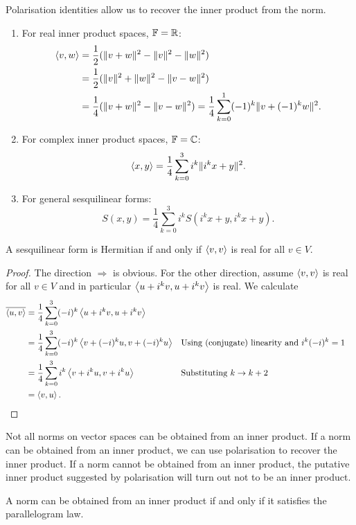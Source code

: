 Polarisation identities allow us to recover the inner product from the norm.
\begin{theorem} \label{polarisationIdentities}
\mbox{}
\begin{enumerate}
\item For real inner product spaces, $\mathbb{F} = \mathbb{R}$:
\begin{align*}
\left\langle v,w \right\rangle &= \frac{1}{2}(\lVert v+w\rVert^2 - \lVert v\rVert^2-\lVert w\rVert^2) \\
&= \frac{1}{2}(\lVert v\rVert^2 + \lVert w\rVert^2-\lVert v-w\rVert^2) \\
&= \frac{1}{4}(\lVert v+w\rVert^2 - \lVert v-w\rVert^2) = \frac{1}{4}\sum_{k=0}^1 (-1)^k\lVert v+(-1)^k w\rVert^2.
\end{align*}
\item For complex inner product spaces, $\mathbb{F} = \mathbb{C}$:
\[ \left\langle x,y \right\rangle = \frac{1}{4}\sum_{k=0}^3 i^k\lVert i^k x+y\rVert^2. \]
\item For general sesquilinear forms:
\[ S(x,y) = \frac{1}{4}\sum_{k=0}^3 i^k S(i^k x+y, i^k x+y). \]
\end{enumerate}
\end{theorem}
\begin{corollary} \label{HermitianRealQuadratic}
A sesquilinear form is Hermitian \textup{if and only if} $\left\langle v,v \right\rangle$ is real for all $v\in V$.
\end{corollary}
\begin{proof}
The direction $\Rightarrow$ is obvious. For the other direction, assume $\left\langle v,v \right\rangle$ is real for all $v\in V$ and in particular $\left\langle u+i^kv,u+i^kv \right\rangle$ is real. We calculate
\begin{align*}
\overline{\left\langle u,v \right\rangle} &= \frac{1}{4}\sum^3_{k=0}(-i)^k\left\langle u+i^kv,u+i^kv \right\rangle \\
&= \frac{1}{4}\sum^3_{k=0}(-i)^k\left\langle v+(-i)^ku,v+(-i)^ku \right\rangle & &\text{Using (conjugate) linearity and $i^k(-i)^k=1$}\\
&= \frac{1}{4}\sum^3_{k=0}i^k\left\langle v+i^ku,v+i^ku \right\rangle & &\text{Substituting $k\to k+2$}\\
&= \left\langle v,u \right\rangle.
\end{align*}
\end{proof}
Not all norms on vector spaces can be obtained from an inner product. If a norm can be obtained from an inner product, we can use polarisation to recover the inner product. If a norm cannot be obtained from an inner product, the putative inner product suggested by polarisation will turn out not to be an inner product.
\begin{proposition}
A norm can be obtained from an inner product \textup{if and only if} it satisfies the parallelogram law.
\end{proposition}
